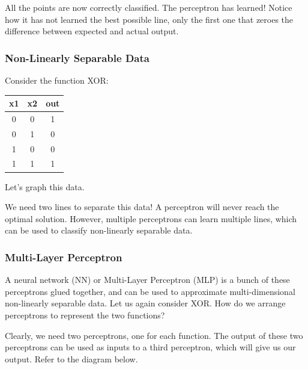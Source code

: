 All the points are now correctly classified. The perceptron has learned! Notice how it has not learned the best possible line, only the first one that zeroes the difference between expected and actual output.
\subsubsection{Non-Linearly Separable Data}
Consider the function XOR:

\begin{center}
	\begin{tabular}{ |c|c|c| } 
		\hline
		x1 & x2 & out \\
		\hline
		0 & 0 & 1 \\ 
		0 & 1 & 0 \\ 
		1 & 0 & 0 \\ 
		1 & 1 & 1 \\ 
		\hline
	\end{tabular}
\end{center}
Let's graph this data.
\begin{center}
\end{center}

We need two lines to separate this data! A perceptron will never reach the optimal solution. However, multiple perceptrons can learn multiple lines, which can be used to classify non-linearly separable data.

\subsubsection{Multi-Layer Perceptron}
A neural network (NN) or Multi-Layer Perceptron (MLP) is a bunch of these perceptrons glued together, and can be used to approximate multi-dimensional non-linearly separable data.
Let us again consider XOR. How do we arrange perceptrons to represent the two functions?

Clearly, we need two perceptrons, one for each function. The output of these two perceptrons can be used as inputs to a third perceptron, which will give us our output. Refer to the diagram below.

